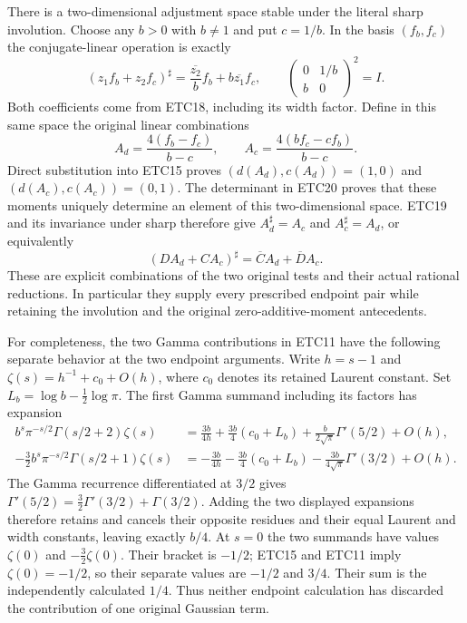 There is a two-dimensional adjustment space stable under the literal
sharp involution. Choose any $b>0$ with $b\ne1$ and put $c=1/b$.
In the basis $(f_b,f_c)$ the conjugate-linear operation is exactly
\begin{equation}\tag{ETC23}
 (z_1f_b+z_2f_c)^\sharp
 =\frac{\overline{z_2}}b f_b
       +b\overline{z_1}f_c,\qquad
 \begin{pmatrix}0&1/b\\b&0\end{pmatrix}^{\!2}=I.
\end{equation}
Both coefficients come from ETC18, including its width factor.
Define in this same space the original linear combinations
\begin{equation}\tag{ETC24}
 A_d=\frac{4(f_b-f_c)}{b-c},\qquad
 A_c=\frac{4(bf_c-cf_b)}{b-c}.
\end{equation}
Direct substitution into ETC15 proves
$(d(A_d),c(A_d))=(1,0)$ and $(d(A_c),c(A_c))=(0,1)$.
The determinant in ETC20 proves that these moments uniquely determine
an element of this two-dimensional space. ETC19 and its invariance
under sharp therefore give $A_d^\sharp=A_c$ and
$A_c^\sharp=A_d$, or equivalently
\begin{equation}\tag{ETC25}
 (D A_d+C A_c)^\sharp
       =\overline C A_d+\overline D A_c.
\end{equation}
These are explicit combinations of the two original tests and their
actual rational reductions. In particular they supply every prescribed
endpoint pair while retaining the involution and the original
zero-additive-moment antecedents.

For completeness, the two Gamma contributions in ETC11 have the
following separate behavior at the two endpoint arguments. Write
$h=s-1$ and $\zeta(s)=h^{-1}+c_0+O(h)$, where $c_0$ denotes its
retained Laurent constant. Set $L_b=\log b-\tfrac12\log\pi$.
The first Gamma summand including its factors has expansion
\begin{equation}\tag{ETC26}
 \begin{split}
 b^s\pi^{-s/2}\Gamma(s/2+2)\zeta(s)
 &=\frac{3b}{4h}+\frac{3b}{4}(c_0+L_b)
                     +\frac{b}{2\sqrt\pi}\Gamma'(5/2)+O(h),\\
 -\frac32b^s\pi^{-s/2}\Gamma(s/2+1)\zeta(s)
 &=-\frac{3b}{4h}-\frac{3b}{4}(c_0+L_b)
                     -\frac{3b}{4\sqrt\pi}\Gamma'(3/2)+O(h).
 \end{split}
\end{equation}
The Gamma recurrence differentiated at $3/2$ gives
$\Gamma'(5/2)=\tfrac32\Gamma'(3/2)+\Gamma(3/2)$.
Adding the two displayed expansions therefore retains and cancels
their opposite residues and their equal Laurent and width constants,
leaving exactly $b/4$. At $s=0$ the two summands have values
$\zeta(0)$ and $-\tfrac32\zeta(0)$. Their bracket is $-1/2$;
ETC15 and ETC11 imply $\zeta(0)=-1/2$, so their separate values
are $-1/2$ and $3/4$. Their sum is the independently calculated
$1/4$. Thus neither endpoint calculation has discarded the
contribution of one original Gaussian term.
